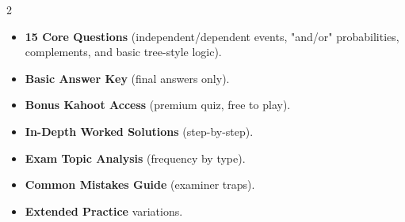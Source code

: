 \documentclass[11pt,a4paper]{article}
\newcommand{\FullReleaseDate}{April 30, 2026}
\begin{document}
\vspace{8pt}

\begin{multicols}{2}
  \begin{tcolorbox}[card, title=\sffamily\bfseries\textcolor{white}{\faHandPointDown\ TODAY (Simplified Version)}, colbacktitle=mainblue, boxed title style={sharp corners, boxrule=0pt}]
    \begin{itemize}[leftmargin=1.2em, itemsep=2pt]
      \item \small \textbf{15 Core Questions} (independent/dependent events, "and/or" probabilities, complements, and basic tree-style logic).
      \item \small \textbf{Basic Answer Key} (final answers only).
      \item \small \textbf{Bonus Kahoot Access} (premium quiz, free to play).
    \end{itemize}
  \end{tcolorbox}

  \columnbreak

  \begin{tcolorbox}[card, title=\sffamily\bfseries\textcolor{white}{\faRocket\ ON \FullReleaseDate\ (Full Upgrade)}, colbacktitle=mainblue, boxed title style={sharp corners, boxrule=0pt}]
    \begin{itemize}[leftmargin=1.2em, itemsep=2pt]
      \item \small \textbf{In-Depth Worked Solutions} (step-by-step).
      \item \small \textbf{Exam Topic Analysis} (frequency by type).
      \item \small \textbf{Common Mistakes Guide} (examiner traps).
      \item \small \textbf{Extended Practice} variations.
    \end{itemize}
  \end{tcolorbox}
\end{multicols}
\end{document}
